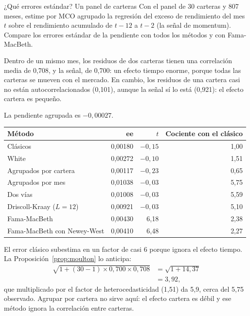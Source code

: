 \begin{ejresuelto}{¿Qué errores estándar? Un panel de carteras}\label{ej:petersen}
\enunciado Con el panel de 30 carteras y 807 meses, estime por MCO agrupado la regresión del exceso de rendimiento del mes $t$ sobre el
rendimiento acumulado de $t-12$ a $t-2$ (la señal de momentum). Compare los errores estándar de la pendiente con todos los métodos y
con Fama-MacBeth.

\solucion
{} Dentro de un mismo mes, los residuos de dos carteras tienen una correlación media de 0,708, y
la señal, de 0,700: un efecto tiempo enorme, porque todas las carteras se mueven con el mercado. En cambio, los residuos de una cartera
casi no están autocorrelacionados (0,101), aunque la señal sí lo está (0,921): el efecto cartera es pequeño.

 La pendiente agrupada es $-0{,}00027$.
\begin{center}\small
\begin{tabular}{@{}lrrr@{}}
\toprule
Método & ee & $t$ & Cociente con el clásico \\
\midrule
Clásicos & 0,00180 & $-0{,}15$ & 1,00 \\
White & 0,00272 & $-0{,}10$ & 1,51 \\
Agrupados por cartera & 0,00117 & $-0{,}23$ & 0,65 \\
Agrupados por mes & 0,01038 & $-0{,}03$ & 5,75 \\
Dos vías & 0,01008 & $-0{,}03$ & 5,59 \\
Driscoll-Kraay ($L=12$) & 0,00921 & $-0{,}03$ & 5,10 \\
\midrule
Fama-MacBeth & 0,00430 & 6,18 & 2,38 \\
Fama-MacBeth con Newey-West & 0,00410 & 6,48 & 2,27 \\
\bottomrule
\end{tabular}
\end{center}
El error clásico subestima en un factor de casi 6 porque ignora el efecto tiempo. La Proposición~\ref{prop:moulton} lo anticipa:
\begin{align*}
  \sqrt{1+(30-1)\times0{,}700\times0{,}708} &= \sqrt{1+14{,}37}\\
                                             &= 3{,}92,
\end{align*}
que multiplicado por el factor de heterocedasticidad (1,51) da 5,9, cerca del 5,75 observado. Agrupar por cartera no sirve aquí:
el efecto cartera es débil y ese método ignora la correlación entre carteras.


\end{ejresuelto}
